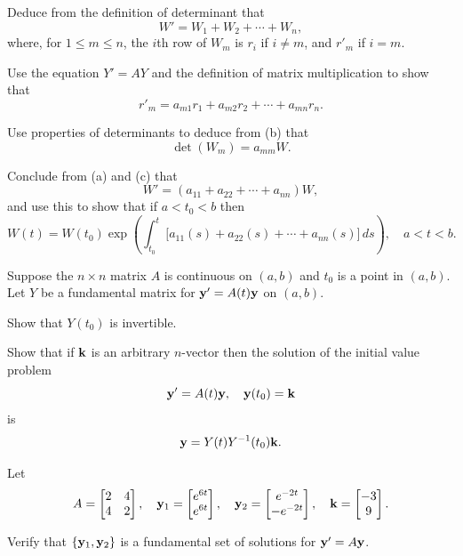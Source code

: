 \begin{exerciselist}
\begin{alist}
\item %
 Deduce from the definition of  determinant that
\[
W'=W_1+W_2+\cdots+W_n,
\]
where, for $1 \le m \le n$, the $i$th row of $W_m$ is $r_i$ if $i \ne m$,
and $r'_m$ if $i=m$.

\item %
 Use the equation $Y'=A Y$
and the definition of matrix multiplication to show that
\[
r'_m=a_{m1}r_1+a_{m2} r_2+\cdots+a_{mn}r_n.
\]

\item %
 Use  properties of determinants to deduce
from (b) that
\[
\det (W_m)=a_{mm}W.
\]

\item %
 Conclude from (a) and (c) that
\[
W'=(a_{11}+a_{22}+\cdots+a_{nn})W,
\]
and use this to  show that  if $a<t_0<b$ then
\[
W(t)=W(t_0)\exp\left(
\int^t_{t_0}\big[a_{11}(s)+a_{22}(s)+\cdots+a_{nn}(s)]\,
ds\right), \quad a < t < b.
\]
\end{alist}

\item\label{exer:10.3.6}Suppose the $n\times n$ matrix $A$ is continuous on $(a,b)$
and $t_0$ is a point in  $(a,b)$. Let $Y$  be a fundamental matrix for
$\mathbf{y}'=A(t)\mathbf{y}$ on  $(a,b)$.
\begin{alist}
\item %
Show that $Y(t_0)$  is invertible.
\item %
Show that if $\mathbf{k}$ is an arbitrary $n$-vector then the solution
of the initial value problem
\[
\mathbf{y}'=A(t)\mathbf{y},\quad \mathbf{y}(t_0)=\mathbf{k}
\]
is
\[
\mathbf{y}=Y(t)Y^{-1}(t_0)\mathbf{k}.
\]
\end{alist}

\item\label{exer:10.3.7}Let
\[
A=\begin{bmatrix}2&4\\4&2\end{bmatrix}, \quad \mathbf{y}_1
=\begin{bmatrix}e^{6t} \\e^{6t}\end{bmatrix}, \quad
\mathbf{y}_2=\begin{bmatrix}e^{-2t} \\-e^{-2t}\end{bmatrix}, \quad
\mathbf{k}=\begin{bmatrix}-3\\ 9\end{bmatrix}.
\]
\begin{alist}
\item %
Verify that $\{\mathbf{y}_1,\mathbf{y}_2\}$
is a fundamental set of solutions for
$\mathbf{y}'=A\mathbf{y}$.


\end{alist}
\end{exerciselist}
